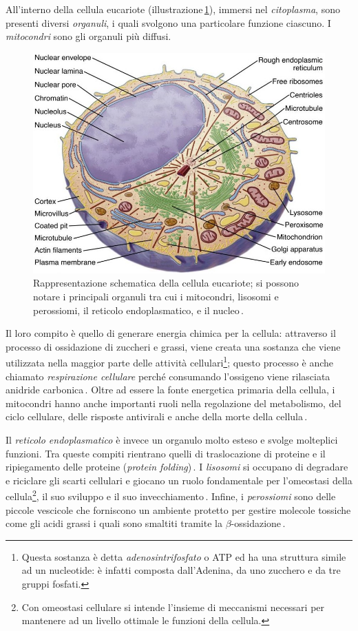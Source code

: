 All'interno della cellula eucariote (illustrazione\,\ref{fig:cell}), immersi nel \textsl{citoplasma}, sono presenti diversi \textsl{organuli}, i quali svolgono una particolare funzione ciascuno. I \textsl{mitocondri} sono gli organuli più diffusi.
% 
\begin{figure}[b!]
    \centering
    \includegraphics[width=.65\textwidth]{assets/cell.jpg}
    \caption[Rappresentazione schematica della cellula eucariote.]{Rappresentazione schematica della cellula eucariote; si possono notare i principali organuli tra cui i mitocondri, lisosomi e perossiomi, il reticolo endoplasmatico, e il nucleo\,\cite{pollard2022cell}.}\label{fig:cell}
\end{figure}
% 
Il loro compito è quello di generare energia chimica per la cellula: attraverso il processo di ossidazione di zuccheri e grassi, viene creata una sostanza che viene utilizzata nella maggior parte delle attività cellulari\footnote{Questa sostanza è detta \textsl{adenosintrifosfato} o ATP ed ha una struttura simile ad un nucleotide: è infatti composta dall'Adenina, da uno zucchero e da tre gruppi fosfati.}; questo processo è anche chiamato \textsl{respirazione cellulare} perché consumando l'ossigeno viene rilasciata anidride carbonica\,\cite{alberts2015essential, chinnery2003mitochondria}. Oltre ad essere la fonte energetica primaria della cellula, i mitocondri hanno anche importanti ruoli nella regolazione del metabolismo, del ciclo cellulare, delle risposte antivirali e anche della morte della cellula\,\cite{mcbride2006mitochondria}.

Il \textsl{reticolo endoplasmatico} è invece un organulo molto esteso e svolge molteplici funzioni. Tra queste compiti rientrano quelli di traslocazione di proteine e il ripiegamento delle proteine (\textsl{protein folding})\,\cite{alberts2015essential, voeltz2002structural}. I \textsl{lisosomi} si occupano di degradare e riciclare gli scarti cellulari e giocano un ruolo fondamentale per l'omeostasi della cellula\footnote{Con omeostasi cellulare si intende l'insieme di meccanismi necessari per mantenere ad un livello ottimale le funzioni della cellula.}, il suo sviluppo e il suo invecchiamento\,\cite{ballabio2016awesome, yang2021lysosome, dell2000lysosome}. Infine, i \textsl{perossiomi} sono delle piccole vescicole che forniscono un ambiente protetto per gestire molecole tossiche come gli acidi grassi i quali sono smaltiti tramite la $\beta$-ossidazione\,\cite{alberts2015essential, islinger2012peroxisome, islinger2018peroxisome}.

